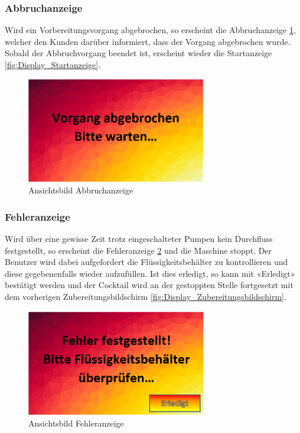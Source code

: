 \subsubsection{Abbruchanzeige}\label{subsubsec:Display_Abbruchanzeige}

Wird ein Vorbereitungsvorgang abgebrochen, so erscheint die Abbruchanzeige \ref{fig:Display_Abbruchanzeige}, welcher den Kunden darüber informiert, dass der Vorgang abgebrochen wurde. Sobald der Abbruchvorgang beendet ist, erscheint wieder die Startanzeige \ref{fig:Display_Startanzeige}.

\begin{figure}[h!]
\centering
\includegraphics[width=0.7\textwidth]{graphics/Display_Abbruchanzeige.png}
\caption{Ansichtsbild Abbruchanzeige}
\label{fig:Display_Abbruchanzeige}
\end{figure}

\newpage

\subsubsection{Fehleranzeige}\label{subsubsec:Display_Fehleranzeige}

Wird über eine gewisse Zeit trotz eingeschalteter Pumpen kein Durchfluss festgestellt, so erscheint die Fehleranzeige \ref{fig:Display_Fehleranzeige} und die Maschine stoppt. Der Benutzer wird dabei aufgefordert die Flüssigkeitsbehälter zu kontrollieren und diese gegebenenfalls wieder aufzufüllen. Ist dies erledigt, so kann mit «Erledigt» bestätigt werden und der Cocktail wird an der gestoppten Stelle fortgesetzt mit dem vorherigen Zubereitungsbildschirm \ref{fig:Display_Zubereitungsbildschirm}.

\begin{figure}[h!]
\centering
\includegraphics[width=0.7\textwidth]{graphics/Display_Fehleranzeige.png}
\caption{Ansichtsbild Fehleranzeige}
\label{fig:Display_Fehleranzeige}
\end{figure}
